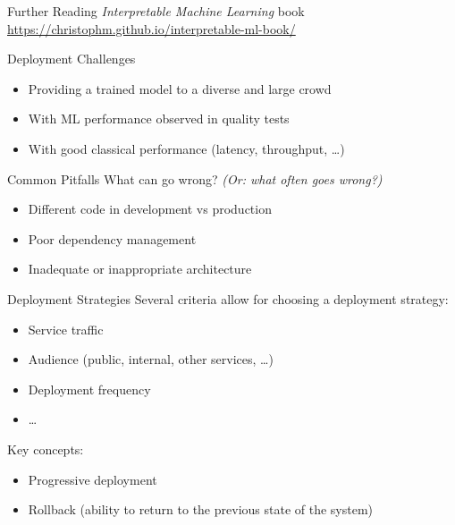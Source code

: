 \begin{frame}{Further Reading}
  \textit{Interpretable Machine Learning} book\\
  \url{https://christophm.github.io/interpretable-ml-book/}

  \hugo
\end{frame}





\begin{frame}{Deployment Challenges}
  \begin{itemize}
    \item Providing a trained model to a diverse and large crowd
    \item With ML performance observed in quality tests
    \item With good classical performance (latency, throughput, \dots)
  \end{itemize}

  \hugo
\end{frame}


\begin{frame}{Common Pitfalls}
  What can go wrong?  \textit{(Or: what often goes wrong?)}

  \begin{itemize}
    \item Different code in development vs production
    \item Poor dependency management
    \item Inadequate or inappropriate architecture
  \end{itemize}

  \hugo
\end{frame}



\begin{frame}{Deployment Strategies}
  Several criteria allow for choosing a deployment strategy:

  \begin{itemize}
    \item Service traffic
    \item Audience (public, internal, other services, \dots)
    \item Deployment frequency
    \item \dots
  \end{itemize}

  Key concepts:
  \begin{itemize}
    \item Progressive deployment
    \item Rollback (ability to return to the previous state of the system)
  \end{itemize}

  \hugo
\end{frame}


